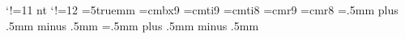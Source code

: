 \documentclass[twoside]{article}%
\begin{document}
\catcode`!=11                                                 %
\let\!int\int \def\int{\displaystyle\!int}                    %
\catcode`!=12                                                 %
\def\pd#1#2{\frac{\partial#1}{\partial#2}}                    %
\baselineskip=5truemm \font\abstractsizebf=cmbx9              %
\font\abstractsizeit=cmti9 \font\shumeiit=cmti8               %
\font\abstractsize=cmr9 \font\shumeisize=cmr8                 %
\abovedisplayskip=.5mm plus .5mm minus .5mm                   %
\belowdisplayskip=.5mm plus .5mm minus .5mm                   %
\def\evenhead{\pushziti\hbox to                               %
\hsize{\rm\shumeisize\thepage\hfill                           %
    \shumeisize  \hspace{10mm}COMM. MATH. RES.                %
    \hfill VOL.~3?}\popziti}                                  %
\def\oddhead{\hbox to \hsize{\shumeisize NO.~?\hfill          %
    {\shumeiit XXXX X. X. et al.}\ \
    \shumeisize A THEOREM OF NEHARI TYPE
    \hfill\rm\shumeisize\thepage}}                            %
\end{document}
